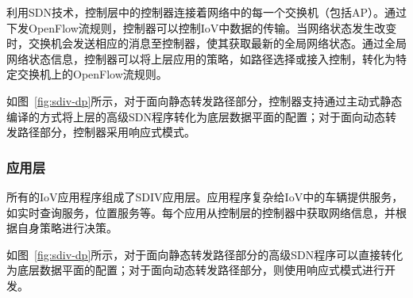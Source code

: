 利用SDN技术，控制层中的控制器连接着网络中的每一个交换机（包括AP）。通过下发OpenFlow流规则，控制器可以控制IoV中数据的传输。当网络状态发生改变时，交换机会发送相应的消息至控制器，使其获取最新的全局网络状态。通过全局网络状态信息，控制器可以将上层应用的策略，如路径选择或接入控制，转化为特定交换机上的OpenFlow流规则。

如图~\ref{fig:sdiv-dp}所示，对于面向静态转发路径部分，控制器支持通过主动式静态编译的方式将上层的高级SDN程序转化为底层数据平面的配置；对于面向动态转发路径部分，控制器采用响应式模式。


\subsubsection{应用层}

所有的IoV应用程序组成了SDIV应用层。应用程序复杂给IoV中的车辆提供服务，如实时查询服务，位置服务等。每个应用从控制层的控制器中获取网络信息，并根据自身策略进行决策。

如图~\ref{fig:sdiv-dp}所示，对于面向静态转发路径部分的高级SDN程序可以直接转化为底层数据平面的配置；对于面向动态转发路径部分，则使用响应式模式进行开发。
%
%

